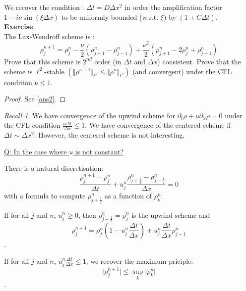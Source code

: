 \documentclass{report}
\theoremstyle{plain}
\theoremstyle{definition}
\theoremstyle{remark}
\newtheorem*{recall}{Recall}
\begin{document}
We recover the condition : $\Delta t = D\Delta x^2$ in order the amplification factor $1 - i\nu \sin(\xi\Delta x)$ to be uniformly bounded (w.r.t. $\xi$) by $(1+C\Delta t)$.\\
\textbf{Exercise}. \\
The Lax-Wendroff scheme is :
\begin{equation}
\rho_j^{n+1} = \rho_j^{n} - \frac{\nu}{2}\left(\rho^n_{j+1} - \rho^n_{j-1} \right) + \frac{\nu^2}{2}\left(\rho^n_{j+1} - 2\rho^n_{j} + \rho^n_{j-1}\right)
\end{equation}
Prove that this scheme is $2^{nd}$ order (in $\Delta t$ and $\Delta x$) consistent.
Prove that the scheme is $\ell^2$-stable $\left(\Vert \rho^{n+1}\Vert_{\ell^2} \le \Vert \rho^{n}\Vert_{\ell^2}\right)$ \quad (and convergent) under the CFL condition $\nu \le 1$.

\begin{proof}
See \ref{ans2}.	
\end{proof}



\begin{recall}
	We have convergence of the upwind scheme for 
	$\partial_t\rho + u\partial_x\rho = 0$ under the
	CFL condition $\frac{u\Delta t}{ \Delta x} \le 1$.
	We have convergence of the centered scheme if
	$\Delta t \sim \Delta x^2$. However, the centered scheme
	is not interesting.
\end{recall}

\underline{Q: In the case where $u$ is not constant?}

There is a natural discretisation:
\begin{equation}
	\frac{ \rho^{n+1}_j - \rho^n_j}{ \Delta t}
	+ u^n_j \frac{ \rho^n_{j+\frac{1}{2}} 
	- \rho^n_{j-\frac{1}{2}}}{ \Delta x} = 0 
\end{equation}
with a formula to compute $\rho^n_{j+\frac{1}{2}}$ as a 
function of $\rho^n_k$.

If for all $j$ and $n$, $u^n_j\ge 0$, then 
$\rho^n_{j+\frac{1}{2}} = \rho^n_j$ is the upwind scheme and
\begin{equation}
	\rho^{n+1}_j = \rho^n_j(1-u^n_j \frac{ \Delta t}{ \Delta x})
	+ u^n_j \frac{ \Delta t}{ \Delta x} \rho^n_{j-1}
\end{equation}.

If for all $j$ and $n$, $u^n_j\frac{ \Delta t}{ \Delta x} \le 1$,
we recover the maximum priciple:
\begin{equation}
	\vert \rho^{n+1}_j \vert \le \sup_k \vert\rho^n_k\vert
\end{equation}.
\end{document}
